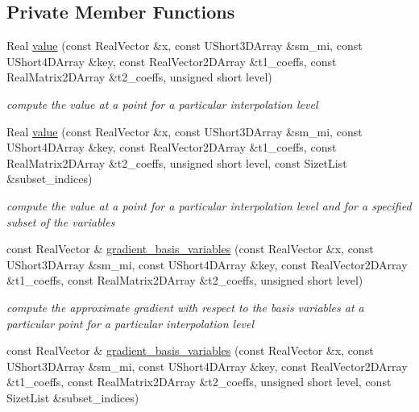 \subsection*{Private Member Functions}
\begin{DoxyCompactItemize}
\item 
Real \hyperlink{classPecos_1_1HierarchInterpPolyApproximation_a74a9d557c508cd043c0c444dc722ed6d}{value} (const Real\+Vector \&x, const U\+Short3\+D\+Array \&sm\+\_\+mi, const U\+Short4\+D\+Array \&key, const Real\+Vector2\+D\+Array \&t1\+\_\+coeffs, const Real\+Matrix2\+D\+Array \&t2\+\_\+coeffs, unsigned short level)\label{classPecos_1_1HierarchInterpPolyApproximation_a74a9d557c508cd043c0c444dc722ed6d}

\begin{DoxyCompactList}\small\item\em compute the value at a point for a particular interpolation level \end{DoxyCompactList}\item 
Real \hyperlink{classPecos_1_1HierarchInterpPolyApproximation_a814452cf28de0138f1095f9cbe1d5471}{value} (const Real\+Vector \&x, const U\+Short3\+D\+Array \&sm\+\_\+mi, const U\+Short4\+D\+Array \&key, const Real\+Vector2\+D\+Array \&t1\+\_\+coeffs, const Real\+Matrix2\+D\+Array \&t2\+\_\+coeffs, unsigned short level, const Sizet\+List \&subset\+\_\+indices)
\begin{DoxyCompactList}\small\item\em compute the value at a point for a particular interpolation level and for a specified subset of the variables \end{DoxyCompactList}\item 
const Real\+Vector \& \hyperlink{classPecos_1_1HierarchInterpPolyApproximation_a143aad43c78dbe10aec18749a4de4dc0}{gradient\+\_\+basis\+\_\+variables} (const Real\+Vector \&x, const U\+Short3\+D\+Array \&sm\+\_\+mi, const U\+Short4\+D\+Array \&key, const Real\+Vector2\+D\+Array \&t1\+\_\+coeffs, const Real\+Matrix2\+D\+Array \&t2\+\_\+coeffs, unsigned short level)\label{classPecos_1_1HierarchInterpPolyApproximation_a143aad43c78dbe10aec18749a4de4dc0}

\begin{DoxyCompactList}\small\item\em compute the approximate gradient with respect to the basis variables at a particular point for a particular interpolation level \end{DoxyCompactList}\item 
const Real\+Vector \& \hyperlink{classPecos_1_1HierarchInterpPolyApproximation_afaffbe62512edfaee23db02601ef43c6}{gradient\+\_\+basis\+\_\+variables} (const Real\+Vector \&x, const U\+Short3\+D\+Array \&sm\+\_\+mi, const U\+Short4\+D\+Array \&key, const Real\+Vector2\+D\+Array \&t1\+\_\+coeffs, const Real\+Matrix2\+D\+Array \&t2\+\_\+coeffs, unsigned short level, const Sizet\+List \&subset\+\_\+indices)\label{classPecos_1_1HierarchInterpPolyApproximation_afaffbe62512edfaee23db02601ef43c6}


\end{DoxyCompactItemize}
